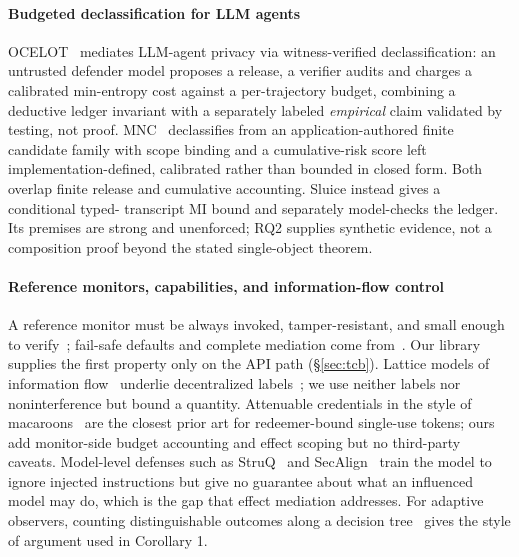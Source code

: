 \documentclass[conference,compsoc]{IEEEtran}
\newcommand{\rev}[1]{#1} %
\newcommand{\sys}{Sluice}
\begin{document}
\paragraph{Budgeted declassification for LLM agents} OCELOT~\cite{ocelot2026}
mediates LLM-agent privacy via witness-verified declassification: an
untrusted defender model proposes a release, a verifier audits and
charges a calibrated min-entropy cost against a per-trajectory budget,
combining a deductive ledger invariant with a separately labeled
\emph{empirical} claim validated by testing, not proof. MNC~\cite{mnc2026}
declassifies from an application-authored finite candidate family with
scope binding and a cumulative-risk score left implementation-defined,
calibrated rather than bounded in closed form. Both overlap finite release and cumulative accounting. \sys{} instead gives a conditional typed-
transcript MI bound and separately model-checks the ledger. Its premises are
strong and unenforced; RQ2 supplies synthetic evidence, not a composition
proof beyond the stated single-object theorem.

\rev{\paragraph{Reference monitors, capabilities, and information-flow control} A reference monitor must be always invoked, tamper-resistant, and small enough to verify~\cite{anderson1972}; fail-safe defaults and complete mediation come from~\cite{saltzer1975}. Our library supplies the first property only on the API path (\S\ref{sec:tcb}). Lattice models of information flow~\cite{denning1976} underlie decentralized labels~\cite{myersliskov2000}; we use neither labels nor noninterference but bound a quantity. Attenuable credentials in the style of macaroons~\cite{birgisson2014} are the closest prior art for redeemer-bound single-use tokens; ours add monitor-side budget accounting and effect scoping but no third-party caveats. Model-level defenses such as StruQ~\cite{struq2025} and SecAlign~\cite{secalign2025} train the model to ignore injected instructions but give no guarantee about what an influenced model may do, which is the gap that effect mediation addresses. For adaptive observers, counting distinguishable outcomes along a decision tree~\cite{kopf2007} gives the style of argument used in Corollary 1.}
\end{document}
